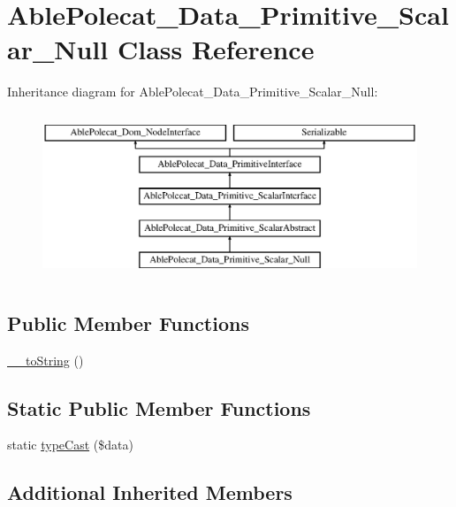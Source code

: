 \hypertarget{class_able_polecat___data___primitive___scalar___null}{}\section{Able\+Polecat\+\_\+\+Data\+\_\+\+Primitive\+\_\+\+Scalar\+\_\+\+Null Class Reference}
\label{class_able_polecat___data___primitive___scalar___null}
Inheritance diagram for Able\+Polecat\+\_\+\+Data\+\_\+\+Primitive\+\_\+\+Scalar\+\_\+\+Null\+:\begin{figure}[H]
\begin{center}
\leavevmode
\includegraphics[height=5.000000cm]{class_able_polecat___data___primitive___scalar___null}
\end{center}
\end{figure}
\subsection*{Public Member Functions}
\begin{DoxyCompactItemize}
\item 
\hyperlink{class_able_polecat___data___primitive___scalar___null_a7516ca30af0db3cdbf9a7739b48ce91d}{\+\_\+\+\_\+to\+String} ()
\end{DoxyCompactItemize}
\subsection*{Static Public Member Functions}
\begin{DoxyCompactItemize}
\item 
static \hyperlink{class_able_polecat___data___primitive___scalar___null_a68640750b79d1cdda3cddcece68a207e}{type\+Cast} (\$data)
\end{DoxyCompactItemize}
\subsection*{Additional Inherited Members}


